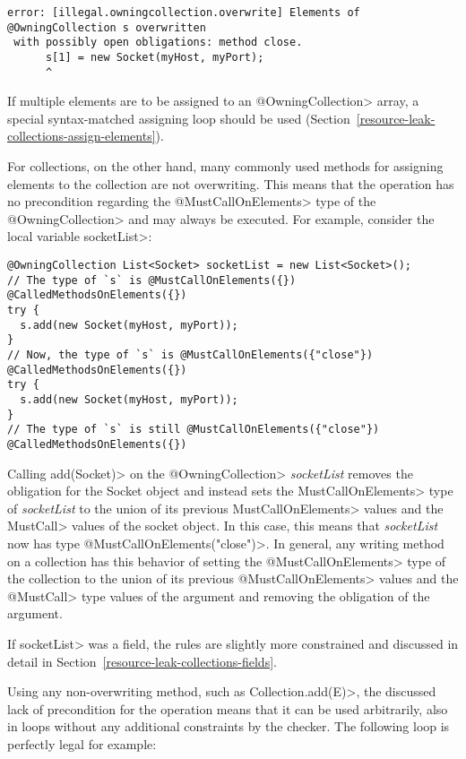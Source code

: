 \begin{verbatim}
error: [illegal.owningcollection.overwrite] Elements of @OwningCollection s overwritten
 with possibly open obligations: method close.
      s[1] = new Socket(myHost, myPort);
      ^
\end{verbatim}

If multiple elements are to be assigned to an \<@OwningCollection> array, a special syntax-matched assigning loop should be used (Section~\ref{resource-leak-collections-assign-elements}).


For collections, on the other hand, many commonly used methods for assigning elements to the collection are not overwriting. This means that the operation has no precondition regarding the \<@MustCallOnElements> type of the \<@OwningCollection> and may always be executed. For example, consider the local variable \<socketList>:

\begin{verbatim}
@OwningCollection List<Socket> socketList = new List<Socket>();
// The type of `s` is @MustCallOnElements({}) @CalledMethodsOnElements({})
try {
  s.add(new Socket(myHost, myPort));
}
// Now, the type of `s` is @MustCallOnElements({"close"}) @CalledMethodsOnElements({})
try {
  s.add(new Socket(myHost, myPort));
}
// The type of `s` is still @MustCallOnElements({"close"}) @CalledMethodsOnElements({})
\end{verbatim}

Calling \<add(Socket)> on the \<@OwningCollection> \textit{socketList} removes the obligation for the Socket object and instead sets the \<MustCallOnElements> type of \textit{socketList} to the union of its previous \<MustCallOnElements> values and the \<MustCall> values of the socket object. In this case, this means that \textit{socketList} now has type  \<@MustCallOnElements({"close"})>. In general, any writing method on a collection has this behavior of setting the \<@MustCallOnElements> type of the collection to the union of its previous \<@MustCallOnElements> values and the \<@MustCall> type values of the argument and removing the obligation of the argument.

If \<socketList> was a field, the rules are slightly more constrained and discussed in detail in Section~\ref{resource-leak-collections-fields}.

Using any non-overwriting method, such as \<Collection.add(E)>, the discussed lack of precondition for the operation means that it can be used arbitrarily, also in loops without any additional constraints by the checker. The following loop is perfectly legal for example:

